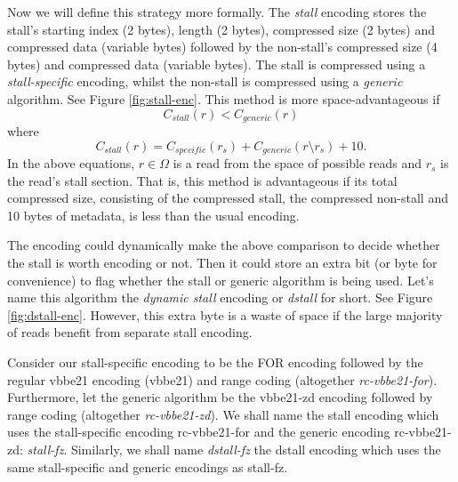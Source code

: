 Now we will define this strategy more formally. The \textit{stall} encoding
stores the stall's starting index (2 bytes), length (2 bytes), compressed size
(2 bytes) and compressed data (variable bytes) followed by the non-stall's
compressed size (4 bytes) and compressed data (variable bytes). The stall is
compressed using a \textit{stall-specific} encoding, whilst the non-stall is
compressed using a \textit{generic} algorithm.  See Figure \ref{fig:stall-enc}.
This method is more space-advantageous if
\[ C_{stall}(r) < C_{generic}(r) \]
where
\[ C_{stall}(r) = C_{specific}(r_s) + C_{generic}(r\setminus r_s) + 10. \]
In the above equations, $r\in\Omega$ is a read from the space of possible reads and $r_s$ is the
read's stall section. That is, this method is advantageous if its total
compressed size, consisting of the compressed stall, the compressed non-stall
and 10 bytes of metadata, is less than the usual encoding.



The encoding could dynamically make the above comparison to decide
whether the stall is worth encoding or not. Then it could store an extra bit (or
byte for convenience) to flag whether the stall or generic algorithm is being
used. Let's name this algorithm the \textit{dynamic stall} encoding or
\textit{dstall} for short. See Figure \ref{fig:dstall-enc}. However, this extra
byte is a waste of space if the large majority of reads benefit from separate
stall encoding.



Consider our stall-specific encoding to be the FOR encoding followed by the
regular vbbe21 encoding (vbbe21) and range coding (altogether
\textit{rc-vbbe21-for}). Furthermore, let the generic algorithm be the
vbbe21-zd encoding followed by range coding (altogether
\textit{rc-vbbe21-zd}).
We shall name the stall encoding which uses the stall-specific encoding
rc-vbbe21-for and the generic encoding rc-vbbe21-zd: \textit{stall-fz}.
Similarly, we shall name \textit{dstall-fz} the dstall encoding which uses the
same stall-specific and generic encodings as stall-fz.

